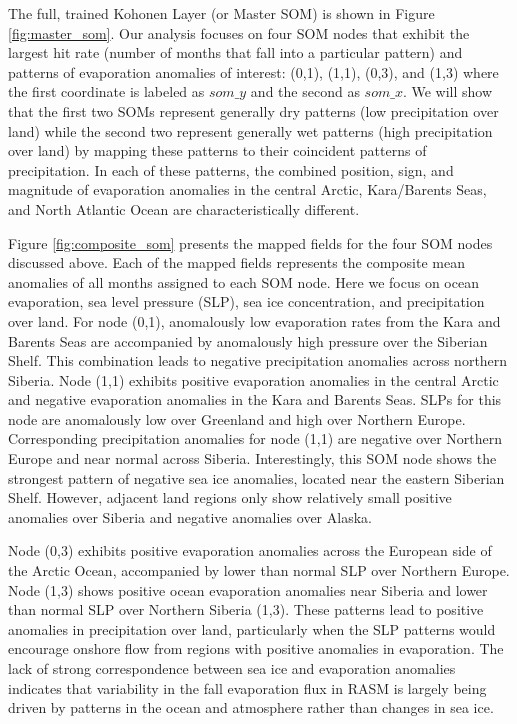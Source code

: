 \documentclass[draft,linenumbers]{agujournal}
\begin{document}
The full, trained Kohonen Layer (or Master SOM) is shown in Figure \ref{fig:master_som}.
Our analysis focuses on four SOM nodes that exhibit the largest hit rate (number of months that fall into a particular pattern) and patterns of evaporation anomalies of interest: (0,1), (1,1), (0,3), and (1,3) where the first coordinate is labeled as $som\_y$ and the second as $som\_x$.
We will show that the first two SOMs represent generally dry patterns (low precipitation over land) while the second two represent generally wet patterns (high precipitation over land) by mapping these patterns to their coincident patterns of precipitation.
In each of these patterns, the combined position, sign, and magnitude of evaporation anomalies in the central Arctic, Kara/Barents Seas, and North Atlantic Ocean are characteristically different.

Figure \ref{fig:composite_som} presents the mapped fields for the four SOM nodes discussed above.
Each of the mapped fields represents the composite mean anomalies of all months assigned to each SOM node.
Here we focus on ocean evaporation, sea level pressure (SLP), sea ice concentration, and precipitation over land.
For node (0,1), anomalously low evaporation rates from the Kara and Barents Seas are accompanied by anomalously high pressure over the Siberian Shelf.
This combination leads to negative precipitation anomalies across northern Siberia.
Node (1,1) exhibits positive evaporation anomalies in the central Arctic and negative evaporation anomalies in the Kara and Barents Seas.
SLPs for this node are anomalously low over Greenland and high over Northern Europe.
Corresponding precipitation anomalies for node (1,1) are negative over Northern Europe and near normal across Siberia.
Interestingly, this SOM node shows the strongest pattern of negative sea ice anomalies, located near the eastern Siberian Shelf.
However, adjacent land regions only show relatively small positive anomalies over Siberia and negative anomalies over Alaska.

Node (0,3) exhibits positive evaporation anomalies across the European side of the Arctic Ocean, accompanied by lower than normal SLP over Northern Europe.
Node (1,3) shows positive ocean evaporation anomalies near Siberia and lower than normal SLP over Northern Siberia (1,3).
These patterns lead to positive anomalies in precipitation over land, particularly when the SLP patterns would encourage onshore flow from regions with positive anomalies in evaporation.
The lack of strong correspondence between sea ice and evaporation anomalies indicates that variability in the fall evaporation flux in RASM is largely being driven by patterns in the ocean and atmosphere rather than changes in sea ice.
\end{document}
